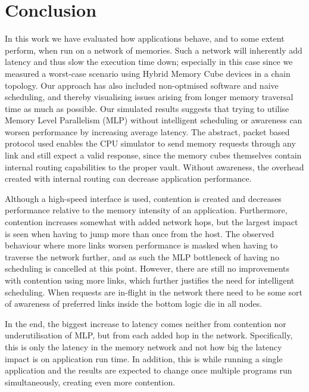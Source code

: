 \chapter{Conclusion}
In this work we have evaluated how applications behave, and to some extent perform, when run on a network of memories. Such a network will inherently add latency and thus slow the execution time down; especially in this case since we measured a worst-case scenario using Hybrid Memory Cube devices in a chain topology. Our approach has also included non-optmised software and naive scheduling, and thereby visualising issues arising from longer memory traversal time as much as possible. Our simulated results suggests that trying to utilise Memory Level Parallelism (MLP) without intelligent scheduling or awareness can worsen performance by increasing average latency. The abstract, packet based protocol used enables the CPU simulator to send memory requests through any link and still expect a valid response, since the memory cubes themselves contain internal routing capabilities to the proper vault. Without awareness, the overhead created with internal routing can decrease application performance. 
\bigskip

Although a high-speed interface is used, contention is created and decreases performance relative to the memory intensity of an application. Furthermore, contention increases somewhat with added network hops, but the largest impact is seen when having to jump more than once from the host. The observed behaviour where more links worsen performance is masked when having to traverse the network further, and as such the MLP bottleneck of having no scheduling is cancelled at this point. However, there are still no improvements with contention using more links, which further justifies the need for intelligent scheduling. When requests are in-flight in the network there need to be some sort of awareness of preferred links inside the bottom logic die in all nodes. 
\bigskip

In the end, the biggest increase to latency comes neither from contention nor underutilisation of MLP, but from each added hop in the network. Specifically, this is only the latency in the memory network and not how big the latency impact is on application run time. In addition, this is while running a single application and the results are expected to change once multiple programs run simultaneously, creating even more contention.